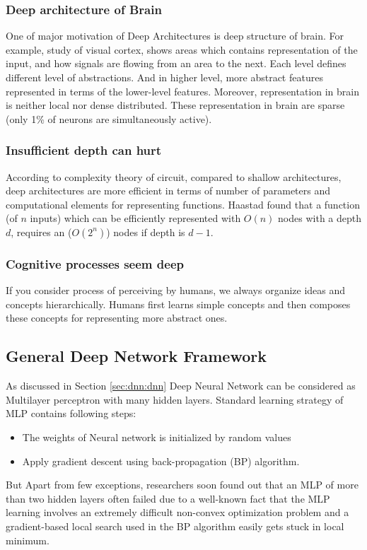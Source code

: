 \subsubsection{Deep architecture of Brain}
One of major motivation of Deep Architectures is deep structure of brain. For example, study of visual cortex, shows areas which contains representation of the input, and how signals are flowing from an area to the next. Each level defines different level of abstractions. And in higher level, more abstract features represented in terms of the lower-level features. Moreover, representation in brain is neither local nor dense distributed. These representation in brain are sparse (only 1\% of neurons are simultaneously active). 

\subsubsection{Insufficient depth can hurt}
According to complexity theory of circuit, compared to  shallow architectures, deep architectures are more efficient in terms of number of parameters and computational elements for representing functions\citep{bengio2007scaling}. Haastad found that a function (of $n$ inputs) which can be efficiently represented with $O(n)$ nodes with a depth $d$, requires an ($O(2^n)$) nodes if depth is $d-1$. \citep{bengio2007greedy}

\subsubsection{Cognitive processes seem deep}
If you consider process of perceiving by humans, we always organize ideas and concepts hierarchically. Humans first learns simple concepts and then composes these concepts for representing more abstract ones. 


\subsection{General Deep Network Framework}
As discussed in Section \ref{sec:dnn:dnn} Deep Neural Network can be considered as Multilayer perceptron with many hidden layers. Standard learning strategy of MLP contains following steps:
\begin{itemize}
\item The weights of Neural network is initialized by random values
\item Apply gradient descent using back-propagation (BP) algorithm.
\end{itemize}
But Apart from few exceptions, researchers soon found out that an MLP of more
than two hidden layers often failed \cite{bengio2007greedy} due to a well-known fact that the MLP learning involves an extremely difficult non-convex optimization problem and a gradient-based local search used in the BP algorithm easily gets stuck in local minimum.

